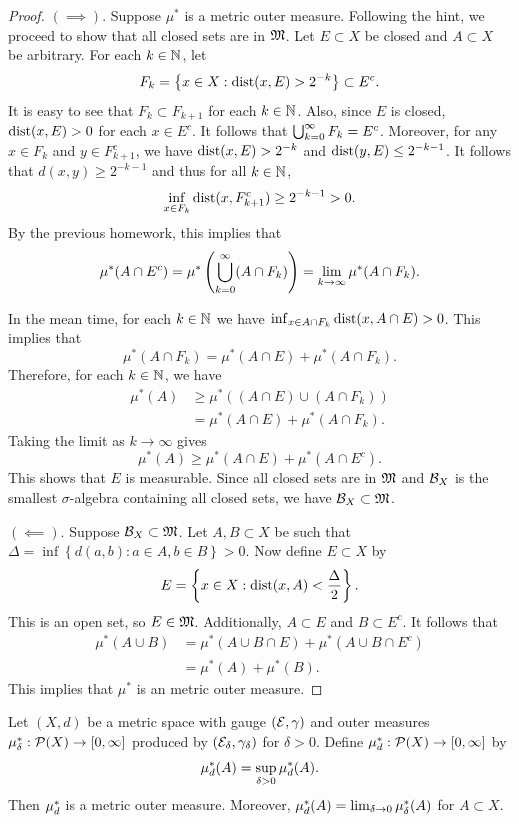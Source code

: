 \documentclass[a4paper]{article}
\begin{document}
\begin{proof}
$(\implies)$. Suppose $\mu^*$ is a metric outer measure. 
Following the hint, we proceed to show that all closed 
sets are in $\mathfrak{M}$. Let $E \subset X$ be closed and 
$A \subset X$ be arbitrary. For each $k \in \mathbb{N}$, let
\[
F_k = \left\{ x \in X : \operatorname{dist}(x, E) > 2^{-k} \right\}
\subset E^c.
\]
It is easy to see that $F_k \subset F_{k+1}$ for each $k \in \mathbb{N}$.
Also, since $E$ is closed, $\operatorname{dist}(x, E) > 0$ for each $x \in E^c$.
It follows that $\bigcup_{k=0}^\infty F_k = E^c$.
Moreover, for any $x \in F_k$
and $y \in F_{k+1}^c$, we have $\operatorname{dist}(x, E) > 2^{-k}$
and $\operatorname{dist}(y, E) \leq 2^{-k-1}$. It follows that  
$d(x, y) \geq 2^{-k-1}$ and thus for all $k \in \mathbb{N}$, 
\[
\inf_{x \in F_k} \operatorname{dist}(x, F_{k+1}^c) \geq 2^{-k-1} > 0.
\]
By the previous homework, this implies that 
\[
\mu^* (A \cap E^c) 
= \mu^* \left( \bigcup_{k=0}^\infty (A \cap F_k) \right)
= \lim_{k \to \infty} \mu^* (A \cap F_k).
\]

In the mean time, 
for each $k \in \mathbb{N}$ we have $\inf_{x \in A \cap F_k} 
\operatorname{dist}(x, A \cap E) > 0$. This implies that
\[
\mu^*(A \cap F_k) = \mu^*(A \cap E) + \mu^* (A \cap F_k).
\]
Therefore, for each $k \in \mathbb{N}$, we have 
\[
\begin{aligned}
\mu^*(A) 
&\geq \mu^*((A \cap E) \cup (A \cap F_k)) \\
&= \mu^* (A \cap E) + \mu^*(A \cap F_k).
\end{aligned}
\]
Taking the limit as $k \to \infty$ gives 
\[
\mu^*(A) \geq \mu^*(A \cap E) + \mu^*(A \cap E^c).
\]
This shows that $E$ is measurable. Since 
all closed sets are in $\mathfrak{M}$ and $\mathcal{B}_X$ is the smallest 
$\sigma$-algebra containing all closed sets, we have 
$\mathcal{B}_X \subset \mathfrak{M}$.

$(\impliedby)$. 
Suppose $\mathcal{B}_X \subset \mathfrak{M}$. Let $A, B \subset X$ be 
such that $\Delta = 
\inf \left\{ d(a, b) : a \in A, b \in B \right\} > 0$. 
Now define $E \subset X$ by 
\[
E = \left\{ x \in X: \operatorname{dist}(x, A) < \frac{\Delta}{2} \right\}.
\]
This is an open set, so $E \in \mathfrak{M}$. 
Additionally, $A \subset E$ and $B \subset E^c$. 
It follows that 
\[
\begin{aligned}
\mu^*(A \cup B) 
&= \mu^*(A \cup B \cap E) + \mu^* (A \cup B \cap E^c) \\
&= \mu^*(A) + \mu^*(B).
\end{aligned}
\]
This implies that $\mu^*$ is an metric outer measure.
\end{proof}

\begin{thm}
  Let $(X, d)$ be a metric space with gauge $(\mathcal{E}, \gamma)$
  and outer measures $\mu^*_\delta: \mathcal{P}(X) \to [0, \infty]$
  produced by $(\mathcal{E}_\delta, \gamma_\delta)$ for $\delta > 0$.
  Define $\mu^*_d : \mathcal{P}(X) \to [0, \infty]$ by
  \[
  \mu^*_d(A) = \sup_{\delta > 0} \mu^*_d (A).
  \]
  Then $\mu^*_d$ is a metric outer measure. Moreover,
  $\mu^*_d(A) = \lim_{\delta \to 0} \mu^*_\delta(A)$
  for $A \subset X$.
\end{thm}
\end{document}
